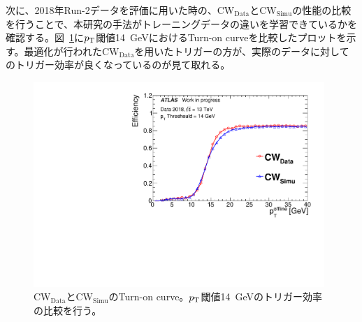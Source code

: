 
次に、2018年Run-2データを評価に用いた時の、$\mathrm{CW_{Data}}$と$\mathrm{CW_{Simu}}$の性能の比較を行うことで、本研究の手法がトレーニングデータの違いを学習できているかを確認する。図~\ref{fig:v06v07}に$p_{\rm{T}}$閾値14~GeVにおけるTurn-on curveを比較したプロットを示す。最適化が行われた$\mathrm{CW_{Data}}$を用いたトリガーの方が、実際のデータに対してのトリガー効率が良くなっているのが見て取れる。
\begin{figure}[tb]
  \centering
  \includegraphics[clip, width=11cm]{fig/5/v06vsv07_MU14_re.pdf}
  \caption{$\mathrm{CW_{Data}}$と$\mathrm{CW_{Simu}}$のTurn-on curve。$p_{\rm{T}}$閾値14~GeVのトリガー効率の比較を行う。}
  \label{fig:v06v07}
\end{figure}


